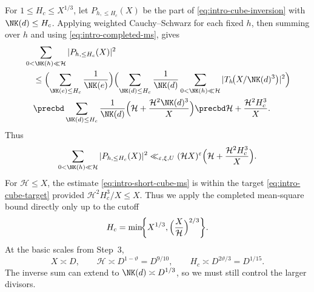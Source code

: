 For $1\le H_c\le X^{1/3}$, let $P_{h,\le H_c}(X)$ be the part of
\eqref{eq:intro-cube-inversion} with $\NK(d)\le H_c$.
Applying weighted Cauchy--Schwarz for each fixed $h$, then summing over $h$
and using \eqref{eq:intro-completed-ms}, gives
\[
 \begin{aligned}
 &\sum_{0<\NK(h)\ll\mathcal H}|P_{h,\le H_c}(X)|^2\\
 &\quad\le\Bigl(\sum_{\NK(e)\le H_c}\frac1{\NK(e)}\Bigr)
       \Bigl(\sum_{\NK(d)\le H_c}\frac1{\NK(d)}
       \sum_{0<\NK(h)\ll\mathcal H}
       |T_h\!\bigl(X/\NK(d)^3\bigr)|^2\Bigr)\\
 &\quad\precbd\sum_{\NK(d)\le H_c}\frac1{\NK(d)}
       \Bigl(\mathcal H+\frac{\mathcal H^2\NK(d)^3}{X}\Bigr)
       \precbd\mathcal H+\frac{\mathcal H^2H_c^3}{X}.
 \end{aligned}
\]
Thus
\begin{equation}\label{eq:intro-short-cube-ms}
 \sum_{0<\NK(h)\ll\mathcal H}|P_{h,\le H_c}(X)|^2
 \ll_{\varepsilon,\xi,U}(\mathcal H X)^\varepsilon
       \Bigl(\mathcal H+\frac{\mathcal H^2H_c^3}{X}\Bigr).
\end{equation}
For $\mathcal H\le X$, the estimate \eqref{eq:intro-short-cube-ms} is within the target \eqref{eq:intro-cube-target} provided $\mathcal H^2H_c^3/X\le X$. Thus we apply the completed mean-square bound directly only up to the cutoff
\begin{equation}\label{eq:intro-cube-cutoff}
 H_c=\min\!\biggl\{X^{1/3},
                \Bigl(\frac{X}{\mathcal H}\Bigr)^{2/3}\biggr\}.
\end{equation}
At the basic scales from Step~3,
\[
 X\asymp D,\qquad \mathcal H\asymp D^{1-\vartheta}=D^{9/10},
 \qquad H_c\asymp D^{2\vartheta/3}=D^{1/15}.
\]
The inverse sum can extend to $\NK(d)\asymp D^{1/3}$, so we must
still control the larger divisors.

